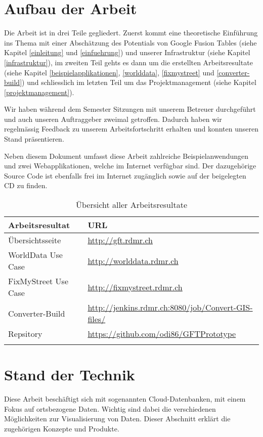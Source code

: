 \section{Aufbau der Arbeit}
Die Arbeit ist in drei Teile gegliedert. Zuerst kommt eine theoretische Einführung ins Thema mit einer Abschätzung des Potentials von Google Fusion Tables (siehe Kapitel \ref{einleitung} und \ref{einfuehrung}) und unserer Infrastruktur (siehe Kapitel \ref{infrastruktur}), im zweiten Teil gehts es dann um die erstellten Arbeitsresultate (siehe Kapitel \ref{beispielapplikationen}, \ref{worlddata}, \ref{fixmystreet} und \ref{converter-build}) und schliesslich im letzten Teil um das Projektmanagement (siehe Kapitel \ref{projektmanagement}).

Wir haben während dem Semester Sitzungen mit unserem Betreuer durchgeführt und auch unseren Auftraggeber zweimal getroffen. Dadurch haben wir regelmässig Feedback zu unserem Arbeitsfortschritt erhalten und konnten unseren Stand präsentieren.

Neben diesem Dokument umfasst diese Arbeit zahlreiche Beispielanwendungen und zwei Webapplikationen, welche im Internet verfügbar sind. Der dazugehörige Source Code ist ebenfalls frei im Internet zugänglich sowie auf der beigelegten CD zu finden.

\begin{longtable}{|l|l|}
\hline 
\textbf{Arbeitsresultat} & \textbf{URL} \\ 
\hline 
Übersichtsseite & \url{http://gft.rdmr.ch} \\ 
\hline 
WorldData Use Case & \url{http://worlddata.rdmr.ch} \\ 
\hline 
FixMyStreet Use Case & \url{http://fixmystreet.rdmr.ch} \\ 
\hline 
Converter-Build & \url{http://jenkins.rdmr.ch:8080/job/Convert-GIS-files/} \\ 
\hline 
Repsitory & \url{https://github.com/odi86/GFTPrototype} \\ 
\hline 
\caption{Übersicht aller Arbeitsresultate}
\label{arbeitsresultate}
\end{longtable} 

\section{Stand der Technik}
Diese Arbeit beschäftigt sich mit sogenannten \gls{Cloud}-Datenbanken, mit einem Fokus auf ortsbezogene Daten. Wichtig sind dabei die verschiedenen Möglichkeiten zur Visualisierung von Daten. Dieser Abschnitt erklärt die zugehörigen Konzepte und Produkte.

